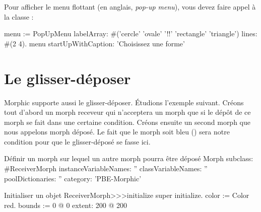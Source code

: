 \documentclass[a4paper,10pt,twoside]{book}
\begin{document}

Pour afficher le menu flottant (en anglais, \emph{pop-up menu}), vous
devez faire appel \`a la classe :
\begin{code}{}
menu := PopUpMenu
	labelArray: #('cercle' 'ovale' '!!' 'rectangle' 'triangle')
	lines: #(2 4).
menu startUpWithCaption: 'Choisissez une forme'
\end{code}


\section{Le glisser-d\'eposer}

Morphic supporte aussi le glisser-d\'eposer. \'Etudions l'exemple
suivant. Cr\'eons tout d'abord un morph receveur qui n'acceptera un
morph que si le d\'ep\^ot de ce morph se fait dans une certaine
condition. Cr\'eons ensuite un second morph que nous appelons morph
d\'epos\'e. Le fait que le morph soit bleu () sera
notre condition pour que le glisser-d\'epos\'e se fasse ici.

\begin{classdef}{D\'efinir un morph sur lequel un autre morph pourra \^etre d\'epos\'e}
Morph subclass: #ReceiverMorph
	instanceVariableNames: ''
	classVariableNames: ''
	poolDictionaries: ''
	category: 'PBE-Morphic'
\end{classdef}

\begin{method}{Initialiser un objet }
ReceiverMorph>>>initialize
	super initialize.
	color := Color red.
	bounds := 0 @ 0 extent: 200 @ 200
\end{method}
\end{document}

